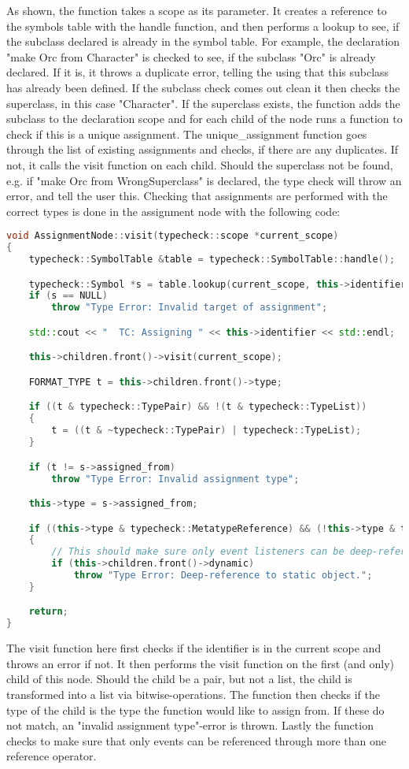 As shown, the function takes a scope as its parameter. It creates a reference to the symbols table with the handle function, and then performs a lookup to see, if the subclass declared is already in the symbol table. For example, the declaration "make Orc from Character" is checked to see, if the subclass "Orc" is already declared. If it is, it throws a duplicate error, telling the using that this subclass has already been defined. If the subclass check comes out clean it then checks the superclass, in this case "Character". If the superclass exists, the function adds the subclass to the declaration scope and for each child of the node runs a function to check if this is a unique assignment. The unique\_assignment function goes through the list of existing assignments and checks, if there are any duplicates. If not, it calls the visit function on each child.
\vspace{10pt}
Should the superclass not be found, e.g. if "make Orc from WrongSuperclass" is declared, the type check will throw an error, and tell the user this.
\vspace{10pt}
Checking that assignments are performed with the correct types is done in the assignment node with the following code:

\begin{lstlisting}[language = c++]
void AssignmentNode::visit(typecheck::scope *current_scope)
{
	typecheck::SymbolTable &table = typecheck::SymbolTable::handle();

	typecheck::Symbol *s = table.lookup(current_scope, this->identifier, false);
	if (s == NULL)
		throw "Type Error: Invalid target of assignment";

	std::cout << "  TC: Assigning " << this->identifier << std::endl;

	this->children.front()->visit(current_scope);

	FORMAT_TYPE t = this->children.front()->type;

	if ((t & typecheck::TypePair) && !(t & typecheck::TypeList))
	{
		t = ((t & ~typecheck::TypePair) | typecheck::TypeList);
	}

	if (t != s->assigned_from)
		throw "Type Error: Invalid assignment type";

	this->type = s->assigned_from;

	if ((this->type & typecheck::MetatypeReference) && (!this->type & typecheck::TypeReferenceEvent))
	{
		// This should make sure only event listeners can be deep-referenced.
		if (this->children.front()->dynamic)
			throw "Type Error: Deep-reference to static object.";
	}

	return;
}
\end{lstlisting}
The visit function here first checks if the identifier is in the current scope and throws an error if not. It then performs the visit function on the first (and only) child of this node. 
\vspace{10pt}
Should the child be a pair, but not a list, the child is transformed into a list via bitwise-operations. The function then checks if the type of the child is the type the function would like to assign from. If these do not match, an "invalid assignment type"-error is thrown. Lastly the function checks to make sure that only events can be referenced through more than one reference operator.
